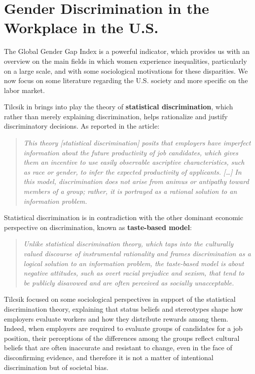 \section{Gender Discrimination in the Workplace in the U.S.}
The Global Gender Gap Index is a powerful indicator, which provides us with an overview on the main fields in which women experience inequalities, particularly on a large scale, and with some sociological motivations for these disparities. We now focus on some literature regarding the U.S. society and more specific on the labor market.

Tilcsik in \cite{tilcsik2021statistical} brings into play the theory of \textbf{statistical discrimination}, which rather than merely explaining discrimination, helps rationalize and justify discriminatory decisions. As reported in the article:
\begin{quote}\emph{This theory \emph{[statistical discrimination]} posits that employers have imperfect information about the future productivity of job candidates, which gives them an incentive to use easily observable ascriptive characteristics, such as race or gender, to infer the expected productivity of applicants. \emph{[\ldots]} In this model, discrimination does not arise from animus or antipathy toward members of a group; rather, it is portrayed as a rational solution to an information problem.} \cite[p.~94]{tilcsik2021statistical}\end{quote}

Statistical discrimination is in contradiction with the other dominant economic perspective on discrimination, known as \textbf{taste-based model}:
\begin{quote}\emph{Unlike statistical discrimination theory, which taps into the culturally valued discourse of instrumental rationality and frames discrimination as a logical solution to an information problem, the taste-based model is about negative attitudes, such as overt racial prejudice and sexism, that tend to be publicly disavowed and are often perceived as socially unacceptable.} \cite[p.~95]{tilcsik2021statistical}\end{quote}

Tilcsik focused on some sociological perspectives in support of the statistical discrimination theory, explaining that status beliefs and stereotypes shape how employers evaluate workers and how they distribute rewards among them. Indeed, when employers are required to evaluate groups of candidates for a job position, their perceptions of the differences among the groups reflect cultural beliefs that are often inaccurate and resistant to change, even in the face of disconfirming evidence, and therefore it is not a matter of intentional discrimination but of societal bias.

